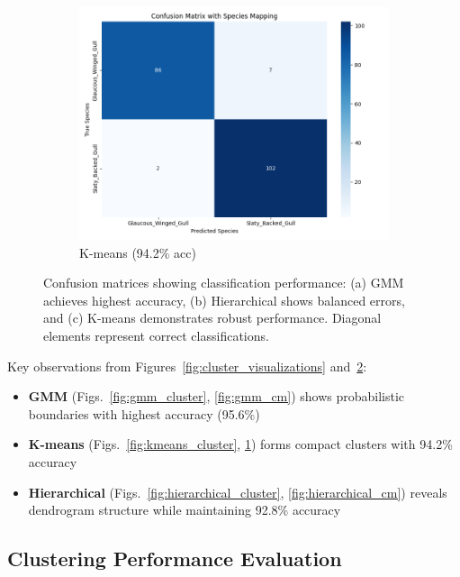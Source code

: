 \documentclass[a4paper,12pt]{report}
\begin{document}
\begin{figure}[htbp]
    \begin{subfigure}[b]{0.32\textwidth}
        \centering
        \includegraphics[width=\textwidth]{images/clustering/kmeans_confusion_matrix.png}
        \caption{K-means (94.2\% acc)}
        \label{fig:kmeans_cm}
    \end{subfigure}
    \caption{Confusion matrices showing classification performance: (a) GMM achieves highest accuracy, (b) Hierarchical shows balanced errors, and (c) K-means demonstrates robust performance. Diagonal elements represent correct classifications.}
    \label{fig:confusion_matrices}
\end{figure}

Key observations from Figures~\ref{fig:cluster_visualizations} and~\ref{fig:confusion_matrices}:
\begin{itemize}
    \item \textbf{GMM} (Figs.~\ref{fig:gmm_cluster}, \ref{fig:gmm_cm}) shows probabilistic boundaries with highest accuracy (95.6\%)
    \item \textbf{K-means} (Figs.~\ref{fig:kmeans_cluster}, \ref{fig:kmeans_cm}) forms compact clusters with 94.2\% accuracy
    \item \textbf{Hierarchical} (Figs.~\ref{fig:hierarchical_cluster}, \ref{fig:hierarchical_cm}) reveals dendrogram structure while maintaining 92.8\% accuracy
\end{itemize}

\subsection{Clustering Performance Evaluation}
\end{document}
